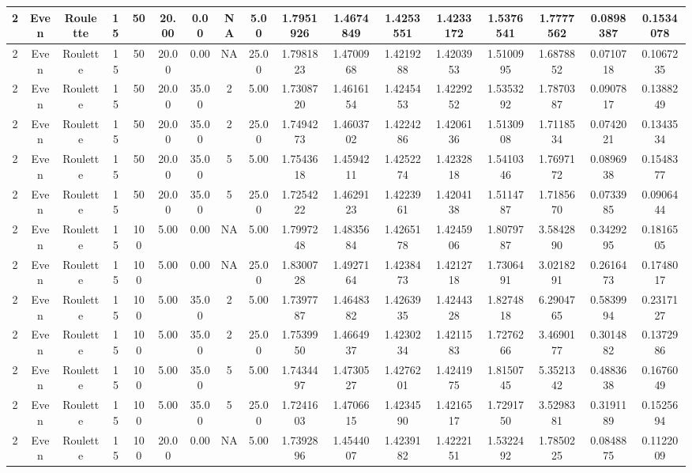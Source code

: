 \begin{longtable}{ | c | c | c | c | c | c | c | c | c | c | c | c | c | c | c | c | c | }
	\hline
	2	&	Even	&	Roulette	&	15	&	50	&	20.00	&	0.00	&	NA	&	5.00	&	1.7951926	&	1.4674849	&	1.4253551	&	1.4233172	&	1.5376541	&	1.7777562	&	0.0898387	&	0.1534078 \\
	\hline
	2	&	Even	&	Roulette	&	15	&	50	&	20.00	&	0.00	&	NA	&	25.00	&	1.7981823	&	1.4700968	&	1.4219288	&	1.4203953	&	1.5100995	&	1.6878852	&	0.0710718	&	0.1067235 \\
	\hline
	2	&	Even	&	Roulette	&	15	&	50	&	20.00	&	35.00	&	2	&	5.00	&	1.7308720	&	1.4616154	&	1.4245453	&	1.4229252	&	1.5353292	&	1.7870387	&	0.0907817	&	0.1388249 \\
	\hline
	2	&	Even	&	Roulette	&	15	&	50	&	20.00	&	35.00	&	2	&	25.00	&	1.7494273	&	1.4603702	&	1.4224286	&	1.4206136	&	1.5130908	&	1.7118534	&	0.0742021	&	0.1343534 \\
	\hline
	2	&	Even	&	Roulette	&	15	&	50	&	20.00	&	35.00	&	5	&	5.00	&	1.7543618	&	1.4594211	&	1.4252274	&	1.4232818	&	1.5410346	&	1.7697172	&	0.0896938	&	0.1548377 \\
	\hline
	2	&	Even	&	Roulette	&	15	&	50	&	20.00	&	35.00	&	5	&	25.00	&	1.7254222	&	1.4629123	&	1.4223961	&	1.4204138	&	1.5114787	&	1.7185670	&	0.0733985	&	0.0906444 \\
	\hline
	2	&	Even	&	Roulette	&	15	&	100	&	5.00	&	0.00	&	NA	&	5.00	&	1.7997248	&	1.4835684	&	1.4265178	&	1.4245906	&	1.8079787	&	3.5842890	&	0.3429295	&	0.1816505 \\
	\hline
	2	&	Even	&	Roulette	&	15	&	100	&	5.00	&	0.00	&	NA	&	25.00	&	1.8300728	&	1.4927164	&	1.4238473	&	1.4212718	&	1.7306491	&	3.0218291	&	0.2616473	&	0.1748017 \\
	\hline
	2	&	Even	&	Roulette	&	15	&	100	&	5.00	&	35.00	&	2	&	5.00	&	1.7397787	&	1.4648382	&	1.4263935	&	1.4244328	&	1.8274818	&	6.2904765	&	0.5839994	&	0.2317127 \\
	\hline
	2	&	Even	&	Roulette	&	15	&	100	&	5.00	&	35.00	&	2	&	25.00	&	1.7539950	&	1.4664937	&	1.4230234	&	1.4211583	&	1.7276266	&	3.4690177	&	0.3014882	&	0.1372986 \\
	\hline
	2	&	Even	&	Roulette	&	15	&	100	&	5.00	&	35.00	&	5	&	5.00	&	1.7434497	&	1.4730527	&	1.4276201	&	1.4241975	&	1.8150745	&	5.3521342	&	0.4883638	&	0.1676049 \\
	\hline
	2	&	Even	&	Roulette	&	15	&	100	&	5.00	&	35.00	&	5	&	25.00	&	1.7241603	&	1.4706615	&	1.4234590	&	1.4216517	&	1.7291750	&	3.5298381	&	0.3191189	&	0.1525694 \\
	\hline
	2	&	Even	&	Roulette	&	15	&	100	&	20.00	&	0.00	&	NA	&	5.00	&	1.7392896	&	1.4544007	&	1.4239182	&	1.4222151	&	1.5322492	&	1.7850225	&	0.0848875	&	0.1122009 \\

\end{longtable}
